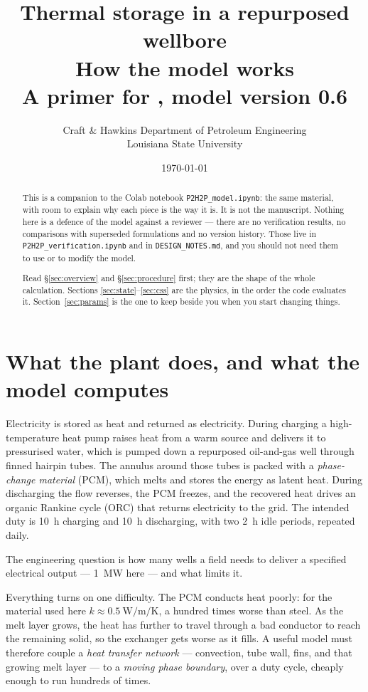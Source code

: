 \documentclass[11pt,a4paper]{article}
\title{\textbf{Thermal storage in a repurposed wellbore}\\[4pt]
\large How the model works\\[8pt]
\normalsize A primer for \code{P2H2P\_model.ipynb}, model version 0.6}
\author{Craft \& Hawkins Department of Petroleum Engineering\\
Louisiana State University}
\date{\today}
\newcommand{\code}[1]{\texttt{\small #1}}
\begin{document}
\maketitle

\begin{abstract}
\noindent
This is a companion to the Colab notebook \code{P2H2P\_model.ipynb}: the same
material, with room to explain why each piece is the way it is. It is not the
manuscript. Nothing here is a defence of the model against a reviewer --- there
are no verification results, no comparisons with superseded formulations and no
version history. Those live in \code{P2H2P\_verification.ipynb} and in
\code{DESIGN\_NOTES.md}, and you should not need them to use or to modify the
model.

Read \S\ref{sec:overview} and \S\ref{sec:procedure} first; they are the shape
of the whole calculation. Sections \ref{sec:state}--\ref{sec:css} are the
physics, in the order the code evaluates it.
Section~\ref{sec:params} is the one to keep beside you when you start changing
things.
\end{abstract}

\tableofcontents

\section{What the plant does, and what the model computes}
\label{sec:overview}

Electricity is stored as heat and returned as electricity. During charging a
high-temperature heat pump raises heat from a warm source and delivers it to
pressurised water, which is pumped down a repurposed oil-and-gas well through
finned hairpin tubes. The annulus around those tubes is packed with a
\emph{phase-change material} (PCM), which melts and stores the energy as latent
heat. During discharging the flow reverses, the PCM freezes, and the recovered
heat drives an organic Rankine cycle (ORC) that returns electricity to the
grid. The intended duty is \SI{10}{\hour} charging and \SI{10}{\hour}
discharging, with two \SI{2}{\hour} idle periods, repeated daily.

The engineering question is how many wells a field needs to deliver a specified
electrical output --- \SI{1}{\mega\watt} here --- and what limits it.

Everything turns on one difficulty. The PCM conducts heat poorly: for the
material used here $k \approx \SI{0.5}{\watt\per\meter\per\kelvin}$, a hundred
times worse than steel. As the melt layer grows, the heat has further to travel
through a bad conductor to reach the remaining solid, so the exchanger gets
worse as it fills. A useful model must therefore couple a \emph{heat transfer
network} --- convection, tube wall, fins, and that growing melt layer --- to a
\emph{moving phase boundary}, over a duty cycle, cheaply enough to run hundreds
of times.
\end{document}
